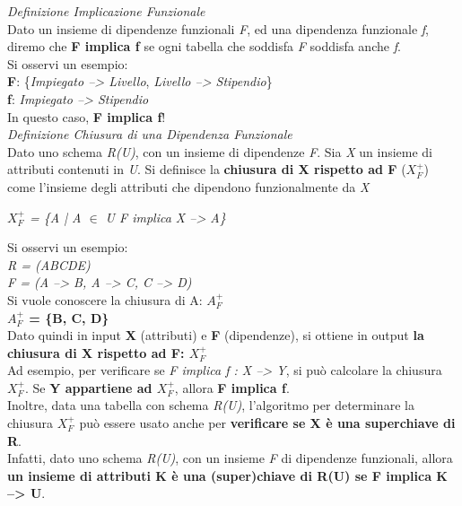\documentclass{article}
\begin{document}
\textit{Definizione Implicazione Funzionale}\\
Dato un insieme di dipendenze funzionali \textit{F}, ed una dipendenza funzionale \textit{f}, diremo che \textbf{F implica f} se ogni tabella che soddisfa \textit{F} soddisfa anche \textit{f}.\vspace{14pt}\\
Si osservi un esempio:\\
\textbf{F}: \{\textit{Impiegato --> Livello}, \textit{Livello --> Stipendio}\}\\
\textbf{f}: \textit{Impiegato --> Stipendio}\\
In questo caso, \textbf{F implica f}!\vspace{14pt}\\
\textit{Definizione Chiusura di una Dipendenza Funzionale}\\
Dato uno schema \textit{R(U)}, con un insieme di dipendenze \textit{F}. Sia \textit{X} un insieme di attributi contenuti in \textit{U}. Si definisce la \textbf{chiusura di X rispetto ad F} (\textbf{$X^+_F$}) come l’insieme degli attributi che dipendono funzionalmente da \textit{X}
\begin{center}
    \textit{$X^+_F$ = \{A | A $\in $ U \quad F implica X --> A\}}
\end{center}
Si osservi un esempio:\\
\textit{R = (ABCDE)}\\
\textit{F = (A --> B, A --> C, C --> D)}\\
Si vuole conoscere la chiusura di A: \textbf{$A^+_F$}\vspace{14pt}\\
\textbf{$A^+_F$ = \{B, C, D\}}\vspace{14pt}\\
Dato quindi in input \textbf{X} (attributi) e \textbf{F} (dipendenze), si ottiene in output \textbf{la chiusura di X rispetto ad F: $X^+_F$}\\
Ad esempio, per verificare se \textit{F implica f : X --> Y}, si può calcolare la chiusura \textit{$X^+_F$}. Se \textbf{Y appartiene ad $X^+_F$}, allora \textbf{F implica f}.\vspace{14pt}\\
Inoltre, data una tabella con schema \textit{R(U)}, l'algoritmo per determinare la chiusura \textit{$X^+_F$} può essere usato anche per \textbf{verificare se X è una superchiave di R}.\\
Infatti, dato uno schema \textit{R(U)}, con un insieme \textit{F} di dipendenze funzionali, allora \textbf{un insieme di attributi K è una (super)chiave di R(U) se F implica K --> U}.\vspace{14pt}\\
\end{document}
